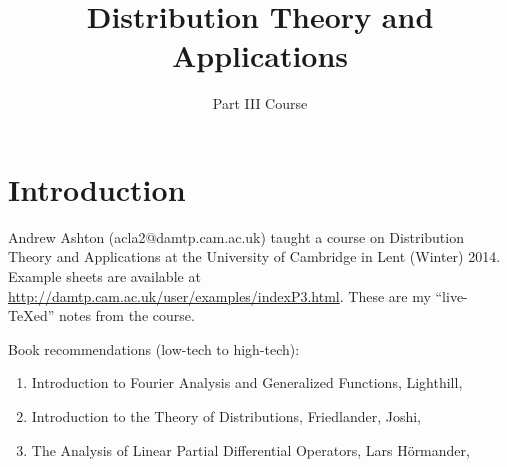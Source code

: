 \def\filepath{C:/Users/Owner/Dropbox/Math/templates}








\def\name{Distribution Theory and Applications}


\pagestyle{fancy}
\chead{} 
\lfoot{} 
\cfoot{\thepage} 
\rfoot{} %
\renewcommand{\headrulewidth}{.3pt} 
\setlength\voffset{0in}


%
\title{Distribution Theory and Applications}
\author{Part III Course}
\maketitle

\startcontents
{}

\chapter*{Introduction}
Andrew Ashton (acla2@damtp.cam.ac.uk) taught a course on Distribution Theory and Applications at the University of Cambridge in Lent (Winter) 2014. Example sheets are available at  \url{http://damtp.cam.ac.uk/user/examples/indexP3.html}.  
These are my ``live-\TeX ed'' notes from the course.

Book recommendations (low-tech to high-tech):
\begin{enumerate}
\item
Introduction to Fourier Analysis and Generalized Functions, Lighthill, \cite{Lighthill}
\item
Introduction to the Theory of Distributions, Friedlander, Joshi, \cite{FJ}
\item
The Analysis of Linear Partial Differential Operators, Lars H\"ormander, \cite{Hormander}
\end{enumerate}

